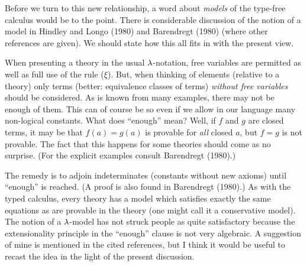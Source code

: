 Before we turn to this new relationship, a word about {\it models} of the type-free
calculus would be to the point. There is considerable discussion of the notion of a model
in Hindley and Longo (1980) and Barendregt (1980) (where other references are given). We
should state how this all fits in with the present view.

When presenting a theory in the usual $\lambda$-notation, free variables are permitted as well
as full use of the rule ($\xi$). But, when thinking of elements (relative to a theory)
only terms (better: equivalence classes of terms) {\it without free variables} should be
considered. As is known from many examples, there may not be enough of them. This can of
course be so even if we allow in our language many non-logical constants. What does
``enough'' mean? Well, if $f$ and $g$ are closed terms, it may be that $f(a) = g(a)$ is
provable for {\it all} closed $a$, but $f = g$ is not provable. The fact that this happens for
some theories should come as no surprise. (For the explicit examples consult Barendregt
(1980).)

The remedy is to adjoin indeterminates (constants without new axioms) until ``enough'' is
reached. (A proof is also found in Barendregt (1980).) As with the typed calculus, every
theory has a model which satisfies exactly the same equations as are provable in the
theory (one might call it a conservative model). The notion of a $\lambda$-model has not struck
people as quite satisfactory because the extensionality principle in the ``enough'' clause
is not very algebraic. A suggestion of mine is mentioned in the cited references, but I
think it would be useful to recast the idea in the light of the present discussion.

